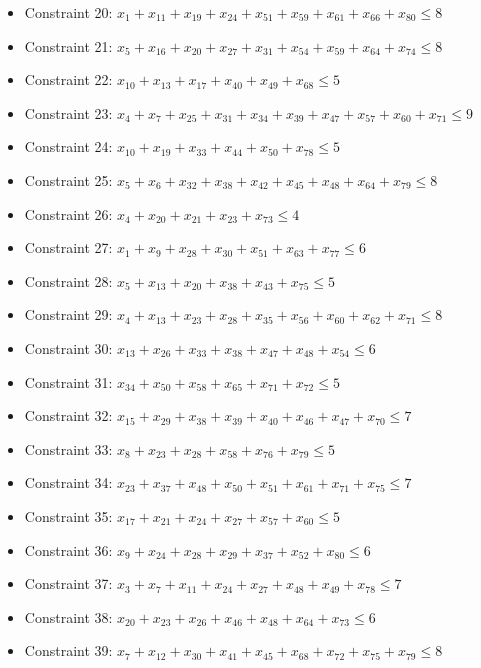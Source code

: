 \documentclass[11pt]{article}
\begin{document}
\begin{itemize}
\item Constraint 20: $x_{1} + x_{11} + x_{19} + x_{24} + x_{51} + x_{59} + x_{61} + x_{66} + x_{80} \le 8$
\item Constraint 21: $x_{5} + x_{16} + x_{20} + x_{27} + x_{31} + x_{54} + x_{59} + x_{64} + x_{74} \le 8$
\item Constraint 22: $x_{10} + x_{13} + x_{17} + x_{40} + x_{49} + x_{68} \le 5$
\item Constraint 23: $x_{4} + x_{7} + x_{25} + x_{31} + x_{34} + x_{39} + x_{47} + x_{57} + x_{60} + x_{71} \le 9$
\item Constraint 24: $x_{10} + x_{19} + x_{33} + x_{44} + x_{50} + x_{78} \le 5$
\item Constraint 25: $x_{5} + x_{6} + x_{32} + x_{38} + x_{42} + x_{45} + x_{48} + x_{64} + x_{79} \le 8$
\item Constraint 26: $x_{4} + x_{20} + x_{21} + x_{23} + x_{73} \le 4$
\item Constraint 27: $x_{1} + x_{9} + x_{28} + x_{30} + x_{51} + x_{63} + x_{77} \le 6$
\item Constraint 28: $x_{5} + x_{13} + x_{20} + x_{38} + x_{43} + x_{75} \le 5$
\item Constraint 29: $x_{4} + x_{13} + x_{23} + x_{28} + x_{35} + x_{56} + x_{60} + x_{62} + x_{71} \le 8$
\item Constraint 30: $x_{13} + x_{26} + x_{33} + x_{38} + x_{47} + x_{48} + x_{54} \le 6$
\item Constraint 31: $x_{34} + x_{50} + x_{58} + x_{65} + x_{71} + x_{72} \le 5$
\item Constraint 32: $x_{15} + x_{29} + x_{38} + x_{39} + x_{40} + x_{46} + x_{47} + x_{70} \le 7$
\item Constraint 33: $x_{8} + x_{23} + x_{28} + x_{58} + x_{76} + x_{79} \le 5$
\item Constraint 34: $x_{23} + x_{37} + x_{48} + x_{50} + x_{51} + x_{61} + x_{71} + x_{75} \le 7$
\item Constraint 35: $x_{17} + x_{21} + x_{24} + x_{27} + x_{57} + x_{60} \le 5$
\item Constraint 36: $x_{9} + x_{24} + x_{28} + x_{29} + x_{37} + x_{52} + x_{80} \le 6$
\item Constraint 37: $x_{3} + x_{7} + x_{11} + x_{24} + x_{27} + x_{48} + x_{49} + x_{78} \le 7$
\item Constraint 38: $x_{20} + x_{23} + x_{26} + x_{46} + x_{48} + x_{64} + x_{73} \le 6$
\item Constraint 39: $x_{7} + x_{12} + x_{30} + x_{41} + x_{45} + x_{68} + x_{72} + x_{75} + x_{79} \le 8$

\end{itemize}
\end{document}
